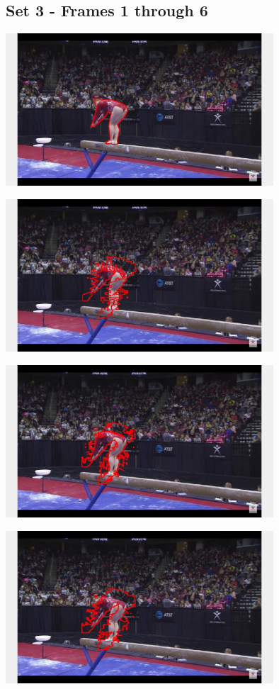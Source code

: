 \documentclass{article}
\begin{document}
	\subsection{Set 3 - Frames 1 through 6}
	
	\begin{center}
		\includegraphics[width=100mm]{img/c1}
	\end{center}
	
	\begin{center}
		\includegraphics[width=100mm]{img/c2}
	\end{center}
	
	\begin{center}
		\includegraphics[width=100mm]{img/c3}
	\end{center}
	
	\begin{center}
		\includegraphics[width=100mm]{img/c4}
	\end{center}
	
\end{document}

